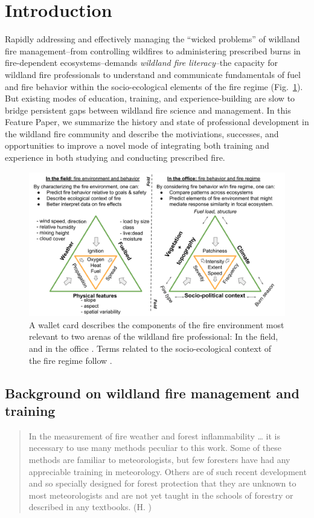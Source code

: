 \documentclass[fire,article,submit,moreauthors,pdftex]{Definitions/mdpi}
\begin{document}
\section{Introduction}

Rapidly addressing and effectively managing the ``wicked problems'' of wildland fire management--from controlling wildfires to administering prescribed burns in fire-dependent ecosystems--demands \emph{wildland fire literacy}--the capacity for wildland fire professionals to understand and communicate fundamentals of fuel and fire behavior within the socio-ecological elements of the fire regime (Fig.~\ref{WalletCard}).
But existing modes of education, training, and experience-building are slow to bridge persistent gaps between wildland fire science and management.
In this Feature Paper, we summarize the history and state of professional development in the wildland fire community and describe the motiviations, successes, and opportunities to improve a novel mode of integrating both training and experience in both studying and conducting prescribed fire.

\begin{figure}[H]
\centering
\includegraphics[width=1\columnwidth]{WalletCard.pdf}
\caption{A wallet card  describes the components of the fire environment most relevant to two arenas of the wildland fire professional: In the field, and in the office \citep{mcgranahan2018}.
Terms related to the socio-ecological context of the fire regime follow \citet{mcgranahan2021}.}
\label{WalletCard}
\end{figure}

\subsection{Background on wildland fire management and training}
\begin{quote}
In the measurement of fire weather and forest inflammability \ldots{} it is necessary to use many methods peculiar to this work.
Some of these methods are familiar to meteorologists, but few foresters have had any appreciable training in meteorology.
Others are of such recent development and so specially designed for forest protection that they are unknown to most meteorologists and are not yet taught in the schools of forestry or described in any textbooks. (H. \citet[][p.~1]{gisborne1936})
\end{quote}
\end{document}
